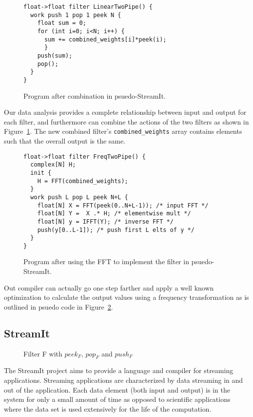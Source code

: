 \begin{figure}
\begin{verbatim}
float->float filter LinearTwoPipe() {
  work push 1 pop 1 peek N {
    float sum = 0;
    for (int i=0; i<N; i++) {
      sum += combined_weights[i]*peek(i);
      }
    push(sum);
    pop();
  }
}
\end{verbatim}
\caption{Program after combination in psuedo-StreamIt.}
\label{fig:example-combine}
\end{figure}

Our data analysis provides a complete relationship between input and output for
each filter, and furthermore can combine the actions of the two filters as shown
in Figure~\ref{fig:example-combine}. The new combined filter's {\tt combined\_weights}
array contains elements such that the overall output is the same.

\begin{figure}
\begin{verbatim}
float->float filter FreqTwoPipe() {
  complex[N] H;
  init {
    H = FFT(combined_weights);
  }
  work push L pop L peek N+L {
    float[N] X = FFT(peek(0..N+L-1)); /* input FFT */
    float[N] Y =  X .* H; /* elementwise mult */
    float[N] y = IFFT(Y); /* inverse FFT */
    push(y[0..L-1]); /* push first L elts of y */
  }
}
\end{verbatim}
\caption{Program after using the FFT to implement the filter in psuedo-StreamIt.}
\label{fig:example-frequency}
\end{figure}

Out compiler can actually go one step farther and apply a well known 
optimization to calculate the output values using a frequency transformation
as is outlined in psuedo code in Figure~\ref{fig:example-frequency}.








\subsection{StreamIt}

\begin{figure}
\center
\epsfxsize=3.0in
\caption{Filter F with $peek_{F}$, $pop_{F}$ and $push_{F}$}
\label{fig:overview-filter}
\end{figure}


The StreamIt\cite{thies02streamit,thies01streamit,william-stream,michal-common} project
aims to provide a language and compiler for streaming applications. Streaming applications 
are characterized by data streaming in and out of the application. Each data element (both
input and output) is in the system for only a small amount of time as opposed to scientific
applications where the data set is used extensively for the life of the computation.
 
